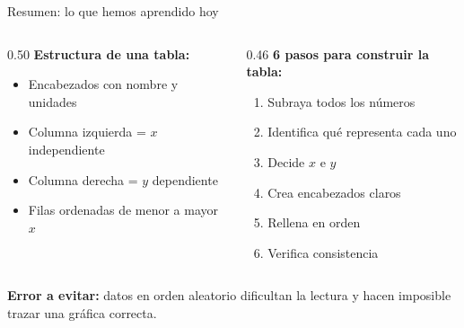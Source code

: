 \documentclass[aspectratio=169, 10pt, spanish]{beamer}
\begin{document}
\begin{frame}{Resumen: lo que hemos aprendido hoy}
  \begin{resumenbox}
    \begin{columns}[T]
      \begin{column}{0.50\textwidth}
      \vspace{0.15cm}
        \textbf{Estructura de una tabla:}
        \begin{itemize}
          \item Encabezados con nombre y unidades
          \item Columna izquierda = \(x\) independiente
          \item Columna derecha = \(y\) dependiente
          \item Filas ordenadas de menor a mayor \(x\)
        \end{itemize}
      \end{column}
      \begin{column}{0.46\textwidth}
        \textbf{6 pasos para construir la tabla:}
        \begin{enumerate}
          \AlmFontSmall
          \item Subraya todos los números
          \item Identifica qué representa cada uno
          \item Decide \(x\) e \(y\)
          \item Crea encabezados claros
          \item Rellena en orden
          \item Verifica consistencia
        \end{enumerate}
      \end{column}
    \end{columns}

    \vspace{0.2cm}
    \separador
    \vspace{0.15cm}
    \AlmFontSmall
    \textbf{Error a evitar:}
    datos en orden aleatorio dificultan la lectura y hacen
    imposible trazar una gráfica correcta.
  \end{resumenbox}

  \vspace{0.2cm}
  \begin{center}
    \quad
    \quad
  \end{center}
\end{frame}
\end{document}
